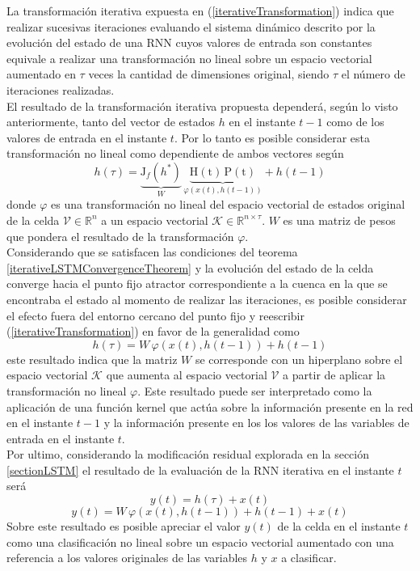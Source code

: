 \documentclass{article}
\begin{document}
	La transformación iterativa expuesta en (\ref{iterativeTransformation}) indica que realizar sucesivas iteraciones evaluando el sistema dinámico descrito por la evolución del estado de una RNN cuyos valores de entrada son constantes equivale a realizar una transformación no lineal sobre un espacio vectorial aumentado en $\tau$ veces la cantidad de dimensiones original, siendo $\tau$ el número de iteraciones realizadas.\\
	El resultado de la transformación iterativa propuesta dependerá, según lo visto anteriormente, tanto del vector de estados $h$ en el instante $t-1$ como de los valores de entrada en el instante $t$. Por lo tanto es posible considerar esta transformación no lineal como dependiente de ambos vectores según
	\begin{equation*}
	h(\tau) = \underbrace{\mathrm{J}_f(h^*)}_{W} \, \underbrace{\mathrm{H(t)} \, \mathrm{P(t)}}_{\varphi(x(t), h(t-1))} + h(t-1)
	\end{equation*}
	donde $\varphi$ es una transformación no lineal del espacio vectorial de estados original de la celda $\mathcal{V} \in \mathbb{R}^n$ a un espacio vectorial $\mathcal{K} \in \mathbb{R}^{n \times \tau}$. $W$ es una matriz de pesos que pondera el resultado de la transformación $\varphi$.\\
	Considerando que se satisfacen las condiciones del teorema \ref{iterativeLSTMConvergenceTheorem} y la evolución del estado de la celda converge hacia el punto fijo atractor correspondiente a la cuenca en la que se encontraba el estado al momento de realizar las iteraciones, es posible considerar el efecto fuera del entorno cercano del punto fijo y reescribir (\ref{iterativeTransformation}) en favor de la generalidad como
	\begin{equation*}
	h(\tau) = W \, \varphi(x(t), h(t-1)) + h(t-1)
	\end{equation*}
	este resultado indica que la matriz $W$ se corresponde con un hiperplano sobre el espacio vectorial $\mathcal{K}$ que aumenta al espacio vectorial $\mathcal{V}$ a partir de aplicar la transformación no lineal $\varphi$. Este resultado puede ser interpretado como la aplicación de una función kernel\cite{46MLKernel} que actúa sobre la información presente en la red en el instante $t-1$ y la información presente en los los valores de las variables de entrada en el instante $t$.\\
	Por ultimo, considerando la modificación residual explorada en la sección \ref{sectionLSTM} el resultado de la evaluación de la RNN iterativa en el instante $t$ será
	\begin{equation*}
	y(t) = h(\tau) + x(t)
	\end{equation*}
	\begin{equation}
	y(t) = W \, \varphi(x(t), h(t-1)) + h(t-1) + x(t)
	\end{equation}
	Sobre este resultado es posible apreciar el valor $y(t)$ de la celda en el instante $t$ como una clasificación no lineal sobre un espacio vectorial aumentado\cite{47NonlinearClasification} con una referencia a los valores originales de las variables $h$ y $x$ a clasificar\cite{28ResidualLearning}.
	
\end{document}

